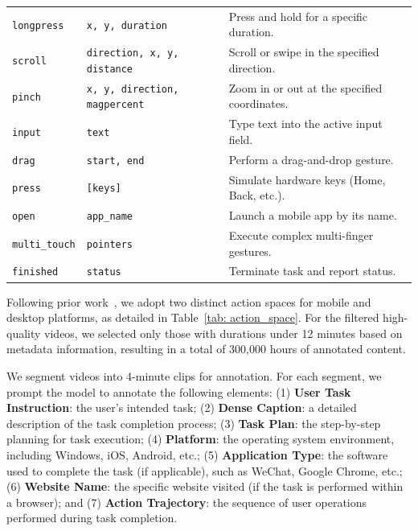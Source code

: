 \documentclass{article}
\theoremstyle{plain}
\theoremstyle{definition}
\theoremstyle{remark}
\begin{document}
\begin{table}[t]
\begin{tabular}{l l p{8cm}}
\texttt{longpress}    & \texttt{x, y, duration}        & Press and hold for a specific duration. \\
\texttt{scroll}       & \texttt{direction, x, y, distance}  & Scroll or swipe in the specified direction. \\
\texttt{pinch}        & \texttt{x, y, direction, magpercent}   & Zoom in or out at the specified coordinates. \\
\texttt{input}        & \texttt{text}             & Type text into the active input field. \\
\texttt{drag}         & \texttt{start, end}       & Perform a drag-and-drop gesture. \\
\texttt{press}        & \texttt{[keys]}           & Simulate hardware keys (Home, Back, etc.). \\
\texttt{open}         & \texttt{app\_name}        & Launch a mobile app by its name.  \\
\texttt{multi\_touch} & \texttt{pointers}         & Execute complex multi-finger gestures. \\
\texttt{finished}     & \texttt{status}           & Terminate task and report status. \\
\bottomrule
\end{tabular}
\end{table}

Following prior work~\citep{xie2024osworld, zhang2025agentcpm}, we adopt two distinct action spaces for mobile and desktop platforms, as detailed in Table~\ref{tab: action_space}. For the filtered high-quality videos, we selected only those with durations under 12 minutes based on metadata information, resulting in a total of 300,000 hours of annotated content.

We segment videos into 4-minute clips for annotation. For each segment, we prompt the model to annotate the following elements: (1) \textbf{User Task Instruction}: the user's intended task; (2) \textbf{Dense Caption}: a detailed description of the task completion process; (3) \textbf{Task Plan}: the step-by-step planning for task execution; (4) \textbf{Platform}: the operating system environment, including Windows, iOS, Android, etc.; (5) \textbf{Application Type}: the software used to complete the task (if applicable), such as WeChat, Google Chrome, etc.; (6) \textbf{Website Name}: the specific website visited (if the task is performed within a browser); and (7) \textbf{Action Trajectory}: the sequence of user operations performed during task completion.
\end{document}
